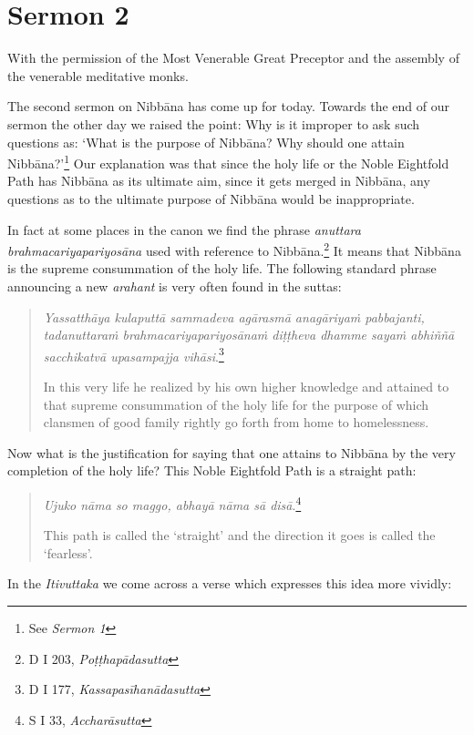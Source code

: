 \chapter{Sermon 2}

\NibbanaOpeningQuote

With the permission of the Most Venerable Great Preceptor and the assembly of the venerable meditative monks.

The second sermon on Nibbāna has come up for today. Towards the end of our sermon the other day we raised the point: Why is it improper to ask such questions as: `What is the purpose of Nibbāna? Why should one attain Nibbāna?'\footnote{See \emph{Sermon 1}} Our explanation was that since the holy life or the Noble Eightfold Path has Nibbāna as its ultimate aim, since it gets merged in Nibbāna, any questions as to the ultimate purpose of Nibbāna would be inappropriate.

In fact at some places in the canon we find the phrase \emph{anuttara brahmacariyapariyosāna} used with reference to Nibbāna.\footnote{D I 203, \emph{Poṭṭhapādasutta}} It means that Nibbāna is the supreme consummation of the holy life. The following standard phrase announcing a new \emph{arahant} is very often found in the suttas:

\begin{quote}
\emph{Yassatthāya kulaputtā sammadeva agārasmā anagāriyaṁ pabbajanti, tadanuttaraṁ brahmacariyapariyosānaṁ diṭṭheva dhamme sayaṁ abhiññā sacchikatvā upasampajja vihāsi}.\footnote{D I 177, \emph{Kassapasīhanādasutta}}

In this very life he realized by his own higher knowledge and attained to that supreme consummation of the holy life for the purpose of which clansmen of good family rightly go forth from home to homelessness.
\end{quote}

Now what is the justification for saying that one attains to Nibbāna by the very completion of the holy life? This Noble Eightfold Path is a straight path:

\begin{quote}
\emph{Ujuko nāma so maggo, abhayā nāma sā disā}.\footnote{S I 33, \emph{Accharāsutta}}

This path is called the `straight' and the direction it goes is called the `fearless'.
\end{quote}

In the \emph{Itivuttaka} we come across a verse which expresses this idea more vividly:

